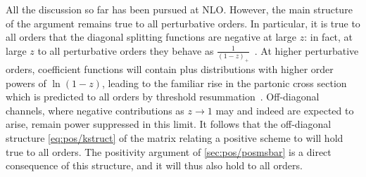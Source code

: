 All the discussion so far has been pursued at NLO\@. However, the main
structure of the argument remains true to all perturbative orders. In
particular,  it is true to all orders that the diagonal splitting
functions are negative at large $z$: in fact, at large $z$ to all
perturbative orders they behave as $\frac{1}{(1-z)_+}$~\cite{Albino:2000cp}. At higher
perturbative orders, coefficient functions will contain plus distributions with higher order
powers of $\ln(1-z)$, leading to  the familiar rise in the partonic
cross section which is predicted to all orders by threshold
resummation~\cite{Catani:1989ne,Sterman:1986aj}. Off-diagonal
channels, where negative contributions as $z\to1$ may and indeed are
expected to arise, 
remain power suppressed in this limit. It follows that the
off-diagonal structure \cref{eq:pos/kstruct}
of the matrix relating a positive scheme to \msbar{} will hold true to
all orders. The positivity argument of \cref{sec:pos/posmsbar} is a
direct consequence of this structure, and it will thus also hold to
all orders.

